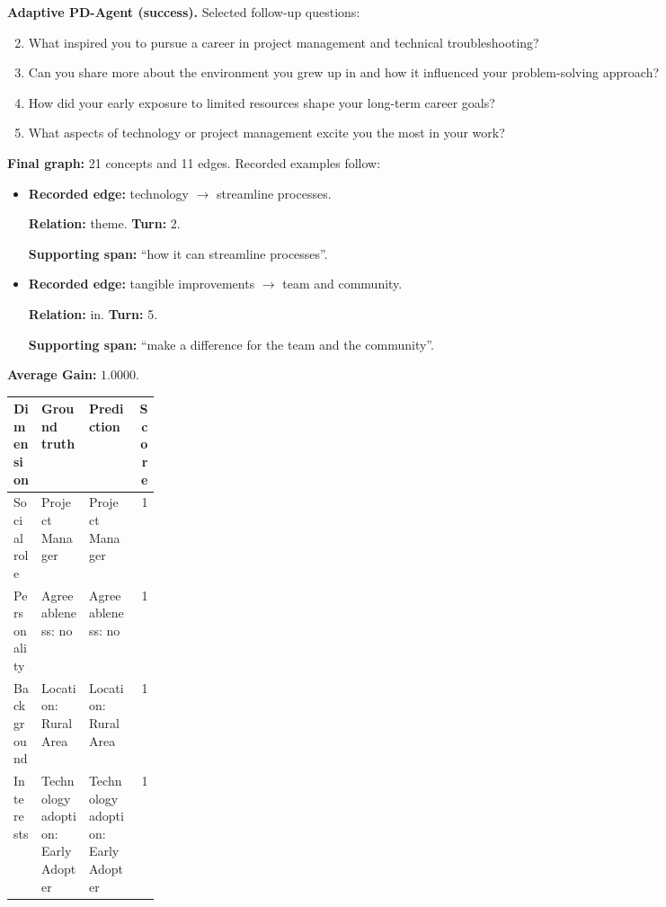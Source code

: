 \documentclass{ieeeaccess}
\begin{document}
\begin{multicols*}{2}
\begin{samepage}
\noindent\textbf{Adaptive PD-Agent (success).} Selected follow-up questions:\par\nopagebreak[4]
\begin{enumerate}
\setcounter{enumi}{1}
\item What inspired you to pursue a career in project management and technical troubleshooting?
\item Can you share more about the environment you grew up in and how it influenced your problem-solving approach?
\item How did your early exposure to limited resources shape your long-term career goals?
\item What aspects of technology or project management excite you the most in your work?
\end{enumerate}
\end{samepage}
\noindent\begin{minipage}{\linewidth}
\noindent\textbf{Final graph:} 21 concepts and 11 edges. Recorded examples follow:
\begin{itemize}
\item \textbf{Recorded edge:} technology $\rightarrow$ streamline processes.
\par\textbf{Relation:} theme. \textbf{Turn:} 2.
\par\textbf{Supporting span:} ``how it can streamline processes''.
\item \textbf{Recorded edge:} tangible improvements $\rightarrow$ team and community.
\par\textbf{Relation:} in. \textbf{Turn:} 5.
\par\textbf{Supporting span:} ``make a difference for the team and the community''.
\end{itemize}
\end{minipage}\par\smallskip
\noindent\begin{minipage}{\linewidth}
\noindent\textbf{Average Gain:} $1.0000$.\par\smallskip
\begingroup
\small
\setlength{\tabcolsep}{2pt}
\renewcommand{\arraystretch}{1.12}
\noindent\begin{tabularx}{\linewidth}{@{}p{0.19\linewidth}>{\raggedright\arraybackslash}X>{\raggedright\arraybackslash}Xr@{}}
\toprule
Dimension & Ground truth & Prediction & Score \\
\midrule
Social role & Project Manager & Project Manager & 1 \\
\addlinespace[2pt]
Personality & Agreeableness: no & Agreeableness: no & 1 \\
\addlinespace[2pt]
Background & Location: Rural Area & Location: Rural Area & 1 \\
\addlinespace[2pt]
Interests & Technology adoption: Early Adopter & Technology adoption: Early Adopter & 1 \\
\bottomrule
\end{tabularx}\par
\endgroup
\end{minipage}\par\medskip


\end{multicols*}
\end{document}
